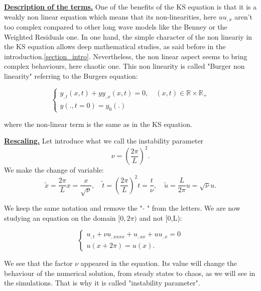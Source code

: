 \documentclass[12pt]{article}
\begin{document}
\underline{\textbf{Description of the terms.}}
One of the benefits of the KS equation is that it is a weakly non linear equation which means that its non-linearities, here $uu_{,x}$ aren't too complex compared 
to other long wave models like the Benney or the Weighted Residuals one. In one hand, the simple character of the non lineariy in the KS equation allows deep
 mathematical studies, as said before in the introduction.\ref{section_intro}. Nevertheless, the non linear aspect seems to bring complex behaviours, here chaotic 
 one. This non linearity is called "Burger non linearity" referring to the Burgers equation:

\begin{equation*}
    \left\{
    \begin{aligned}
        y_{,t}(x, t) + yy_{,x}(x, t) = 0, \quad  (x,t) \in \mathbb{R}\times \mathbb{R}_+\\
        y(., t=0)=y_0(.)
    \end{aligned}
    \right.
\end{equation*}

where the non-linear term is the same as in the KS equation.

\underline{\textbf{Rescaling.}}
Let introduce what we call the instability parameter \begin{equation}
    \nu = \left( \frac{2\pi}{L}\right)^2.
\end{equation}
We make the change of variable:
\begin{equation}
    \tilde{x}= \frac{2\pi}{L}x = \frac{x}{\sqrt{\nu}},\quad \tilde{t}=\left( \frac{2\pi}{L}\right)^2t =\frac{t}{\nu},\quad  \tilde{u}=\frac{L}{2\pi}u=\sqrt{\nu}u.
\end{equation}

We keep the same notation and remove the " $\tilde{}$ " from the letters. We are now studying an equation on the domain $[0,2\pi)$ and not [0,L): 


\begin{equation}\label{KS_eq_2pi}
\left\{
\begin{aligned}
    u_{,t}  + \nu u_{,xxxx} + u_{,xx} + uu_{,x} = 0 \\
    u(x+2\pi)=u(x). 
\end{aligned}
\right.
\end{equation}

We see that the factor $\nu$ appeared in the equation. Its value will change the behaviour of the numerical solution, from steady states to chaos, as we will 
see in the simulations. That is why it is called "instability parameter".
\\
\end{document}
